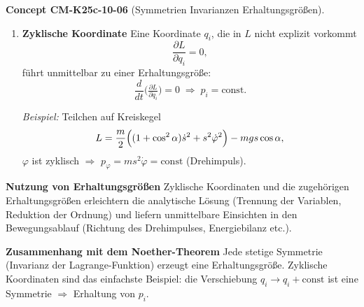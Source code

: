 \documentclass[10pt, letterpaper]{article}
\newcommand{\CustomHeading}[3]{%
  \par\medskip\noindent%
  \textbf{#1 #2} \textnormal{(#3)}.\enskip%
}
\newenvironment{CONC}[2]{\CustomHeading{Concept}{#1}{#2}}{}
\begin{document}
\begin{CONC}{CM-K25c-10-06}{Symmetrien Invarianzen Erhaltungsgrößen}
\begin{enumerate}
\item \textbf{Zyklische Koordinate}  
Eine Koordinate $q_i$, die in $L$ nicht explizit vorkommt
\[
  \frac{\partial L}{\partial q_i}=0,
\]
führt unmittelbar zu einer Erhaltungsgröße:
\[
  \frac{d}{dt}\bigl(\tfrac{\partial L}{\partial\dot q_i}\bigr)=0
  \;\Longrightarrow\;
  p_i=\text{const}.
\]

\textit{Beispiel:} Teilchen auf Kreiskegel  
\[
  L=\frac{m}{2}
     \Bigl((1+\cos^{2}\alpha)\dot s^{2}+s^{2}\dot\varphi^{2}\Bigr)
     -mg s\cos\alpha,
\]
$\varphi$ ist zyklisch $\Rightarrow$
$p_\varphi=m s^{2}\dot\varphi=\text{const}$ (Drehimpuls).

\end{enumerate}

\textbf{Nutzung von Erhaltungsgrößen}  
Zyklische Koordinaten und die zugehörigen Erhaltungsgrößen erleichtern
die analytische Lösung (Trennung der Variablen, Reduktion der Ordnung)
und liefern unmittelbare Einsichten in den Bewegungsablauf (Richtung
des Drehimpulses, Energiebilanz etc.).

\textbf{Zusammenhang mit dem Noether-Theorem}  
Jede stetige Symmetrie (Invarianz der Lagrange-Funktion) erzeugt eine
Erhaltungsgröße.  
Zyklische Koordinaten sind das einfachste Beispiel: die Verschiebung
$q_i\!\to\!q_i+\text{const}$ ist eine Symmetrie $\Rightarrow$
Erhaltung von $p_i$.
\end{CONC}
\end{document}
